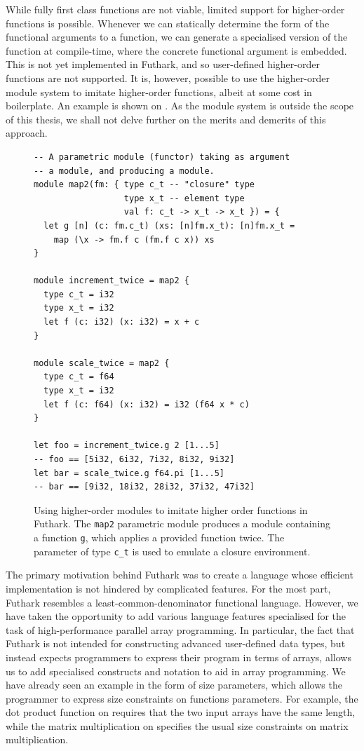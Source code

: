 \begin{description}
  While fully first class functions are not viable, limited support
  for higher-order functions is possible.  Whenever we can statically
  determine the form of the functional arguments to a function, we can
  generate a specialised version of the function at compile-time,
  where the concrete functional argument is embedded.  This is not yet
  implemented in Futhark, and so user-defined higher-order functions
  are not supported.  It is, however, possible to use the higher-order
  module system to imitate higher-order functions, albeit at some cost
  in boilerplate.  An example is shown on .
  As the module system is outside the scope of this thesis, we shall
  not delve further on the merits and demerits of this approach.
\end{description}

\begin{figure}
  \centering
\begin{lstlisting}[xleftmargin=0pt]
-- A parametric module (functor) taking as argument
-- a module, and producing a module.
module map2(fm: { type c_t -- "closure" type
                  type x_t -- element type
                  val f: c_t -> x_t -> x_t }) = {
  let g [n] (c: fm.c_t) (xs: [n]fm.x_t): [n]fm.x_t =
    map (\x -> fm.f c (fm.f c x)) xs
}

module increment_twice = map2 {
  type c_t = i32
  type x_t = i32
  let f (c: i32) (x: i32) = x + c
}

module scale_twice = map2 {
  type c_t = f64
  type x_t = i32
  let f (c: f64) (x: i32) = i32 (f64 x * c)
}

let foo = increment_twice.g 2 [1...5]
-- foo == [5i32, 6i32, 7i32, 8i32, 9i32]
let bar = scale_twice.g f64.pi [1...5]
-- bar == [9i32, 18i32, 28i32, 37i32, 47i32]
\end{lstlisting}
  \caption{Using higher-order modules to imitate higher order
    functions in Futhark.  The \lstinline{map2} parametric module
    produces a module containing a function \lstinline{g}, which
    applies a provided function twice.  The parameter of type
    \lstinline{c_t} is used to emulate a closure environment.}
  \label{fig:faking-hof}
\end{figure}

The primary motivation behind Futhark was to create a language whose
efficient implementation is not hindered by complicated features.  For
the most part, Futhark resembles a least-common-denominator functional
language.  However, we have taken the opportunity to add various
language features specialised for the task of high-performance
parallel array programming.  In particular, the fact that Futhark is
not intended for constructing advanced user-defined data types, but
instead expects programmers to express their program in terms of
arrays, allows us to add specialised constructs and notation to aid in
array programming.  We have already seen an example in the form of
size parameters, which allows the programmer to express size
constraints on functions parameters.  For example, the dot product
function on  requires that the two input
arrays have the same length, while the matrix multiplication on
 specifies the usual size constraints on
matrix multiplication.

